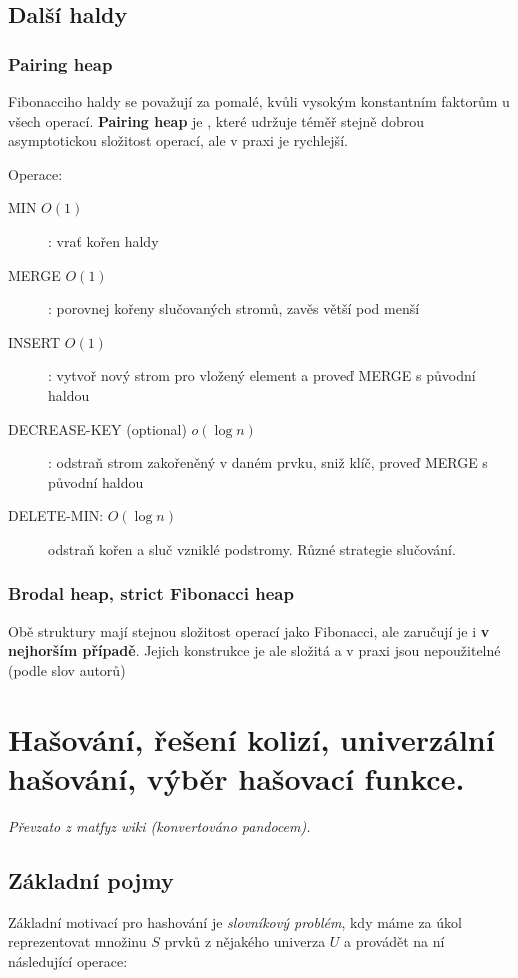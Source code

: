 \documentclass[11pt]{report} %
\numberwithin{equation}{section}
\begin{document}
\subsection{Další haldy}

\subsubsection{Pairing heap}
Fibonacciho haldy se považují za pomalé, kvůli vysokým konstantním faktorům u všech operací. \textbf{Pairing heap} je , které udržuje téměř stejně dobrou asymptotickou složitost operací, ale v praxi je rychlejší.

Operace:
\begin{description}
	
	
	\item[MIN $O(1)$]: vrať kořen haldy
	\item[MERGE $O(1)$]: porovnej kořeny slučovaných stromů, zavěs větší pod menší
	\item[INSERT $O(1)$]: vytvoř nový strom pro vložený element a proveď MERGE s původní haldou
	\item[DECREASE-KEY (optional) $o(\log n)$]: odstraň strom zakořeněný v daném prvku, sniž klíč, proveď MERGE s původní haldou
	\item[DELETE-MIN: $O(\log n)$] odstraň kořen a sluč vzniklé podstromy. Různé strategie slučování.
\end{description}


\subsubsection{Brodal heap, strict Fibonacci heap}
Obě struktury mají stejnou složitost operací jako Fibonacci, ale zaručují je i \textbf{v nejhorším případě}. Jejich konstrukce je ale složitá a v praxi jsou nepoužitelné (podle slov autorů)


\section{Hašování, řešení kolizí, univerzální hašování, výběr hašovací funkce.}

\textit{Převzato z matfyz wiki (konvertováno pandocem).}
\subsection{Základní pojmy}

Základní motivací pro hashování je \emph{slovníkový problém}, kdy máme za úkol reprezentovat množinu $S$ prvků z nějakého univerza $U$ a provádět na ní následující operace:
\end{document}
